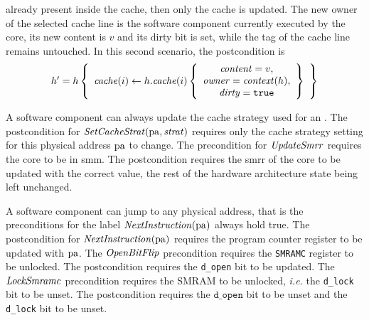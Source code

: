 \begin{enumerate}
  already present inside the cache, then only the cache is updated.
  The new owner of the selected cache line is the software component currently
  executed by the core, its new content is \( v \)  and its dirty bit is set,
  while the tag of the cache line remains untouched.
  In this second scenario, the postcondition is
  \[
    \begin{array}{l}
      h' = h \left\{
      \begin{array}{c}
        \mathit{cache}(i) \leftarrow h.\mathit{cache}(i) \left\{
        \begin{array}{c}
          \mathit{content} = v, \\
          \mathit{owner} = \mathit{context}(h),\\
          \mathit{dirty} = \mathtt{true}
        \end{array}
        \right\}
      \end{array}
      \right\}
    \end{array}
  \]
\end{enumerate}

A software component can always update the cache strategy used for an \IO.
%
The postcondition for \( \mathit{SetCacheStrat}(\mathrm{pa}, \mathit{strat}) \)
requires only the cache strategy setting for this physical address $\mathrm{pa}$ to
change. %
%
%
The precondition for \( \mathit{UpdateSmrr} \) requires the core to be in
\ac{smm}. %
%
%
The postcondition requires the \ac{smrr} of the core to be updated with the
correct value, the rest of the hardware architecture state being left unchanged.

A software component can jump to any physical address, that is the preconditions
for the label \( \mathit{NextInstruction}(\mathrm{pa}) \) always hold true.
%
The postcondition for \( \mathit{NextInstruction}(\mathrm{pa}) \) requires the
program counter register to be updated with \( \mathrm{pa} \).
%
The \( \mathit{OpenBitFlip} \) precondition requires the \texttt{SMRAMC} register
to be unlocked.
%
The postcondition requires the \texttt{d\_open} bit to be updated.
%
The $\mathit{LockSmramc}$ precondition requires the SMRAM to be unlocked,
\emph{i.e.} the \texttt{d\_lock} bit to be unset.
%
The postcondition requires the $\texttt{d\_open}$ bit to be unset and the
\texttt{d\_lock} bit to be unset.

